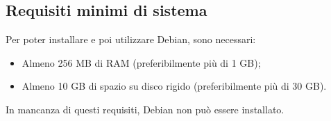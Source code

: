 \subsection{Requisiti minimi di sistema}
Per poter installare e poi utilizzare Debian, sono necessari:
\begin{itemize}
	\item Almeno 256 MB di RAM (preferibilmente più di 1 GB);
	\item Almeno 10 GB di spazio su disco rigido (preferibilmente più di 30 GB).
\end{itemize}
In mancanza di questi requisiti, Debian non può essere installato.
